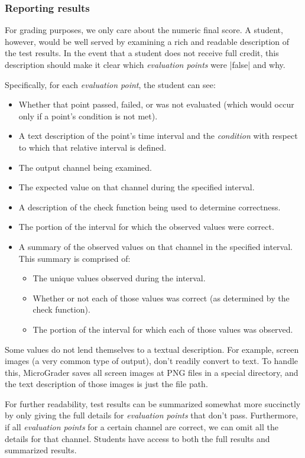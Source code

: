 \documentclass[12pt]{article}
\begin{document}
\subsubsection{Reporting results}
For grading purposes, we only care about the numeric final score.  A student, however, would be well served by examining a rich and readable description of the test results.  In the event that a student does not receive full credit, this description should make it clear which \textit{evaluation points} were |false| and why.

Specifically, for each \textit{evaluation point}, the student can see:

\begin{itemize}
\item Whether that point passed, failed, or was not evaluated (which would occur only if a point's condition is not met).
\item A text description of the point's time interval and the \textit{condition} with respect to which that relative interval is defined.
\item The output channel being examined.
\item The expected value on that channel during the specified interval.
\item A description of the check function being used to determine correctness.
\item The portion of the interval for which the observed values were correct.
\item A summary of the observed values on that channel in the specified interval.  This summary is comprised of:
\begin{itemize}
\item The unique values observed during the interval.
\item Whether or not each of those values was correct (as determined by the check function).
\item The portion of the interval for which each of those values was observed.
\end{itemize}
\end{itemize}

Some values do not lend themselves to a textual description.  For example, screen images (a very common type of output), don't readily convert to text.  To handle this, MicroGrader saves all screen images at PNG files in a special directory, and the text description of those images is just the file path.

For further readability, test results can be summarized somewhat more succinctly by only giving the full details for \textit{evaluation points} that don't pass.  Furthermore, if all \textit{evaluation points} for a certain channel are correct, we can omit all the details for that channel.  Students have access to both the full results and summarized results.
\end{document}
